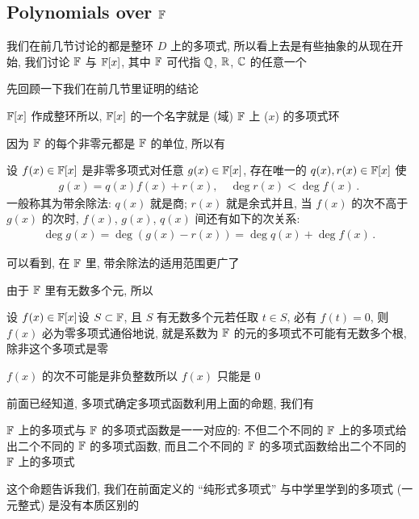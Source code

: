 \subsection*{Polynomials over $\mathbb{F}$}

我们在前几节讨论的都是整环 $D$ 上的多项式, 所以看上去是有些抽象的\period 从现在开始, 我们讨论 $\mathbb{F}$ 与 $\mathbb{F}[x]$, 其中 $\mathbb{F}$ 可代指 $\mathbb{Q}$, $\mathbb{R}$, $\mathbb{C}$ 的任意一个\period

先回顾一下我们在前几节里证明的结论\period

\begin{proposition}
    $\mathbb{F}[x]$ 作成整环\period 所以, $\mathbb{F}[x]$ 的一个名字就是 (域) $\mathbb{F}$ 上 ($x$) 的多项式环\period
\end{proposition}

因为 $\mathbb{F}$ 的每个非零元都是 $\mathbb{F}$ 的单位, 所以有

\begin{proposition}
    设 $f(x) \in \mathbb{F}[x]$ 是非零多项式\period 对任意 $g(x) \in \mathbb{F}[x]$, 存在唯一的 $q(x), r(x) \in \mathbb{F}[x]$ 使
    \begin{align*}
        g(x) = q(x) f(x) + r(x), \quad \deg r(x) < \deg f(x) \period
    \end{align*}
    一般称其为带余除法: $q(x)$ 就是商; $r(x)$ 就是余式\period 并且, 当 $f(x)$ 的次不高于 $g(x)$ 的次时, $f(x)$, $g(x)$, $q(x)$ 间还有如下的次关系:
    \begin{align*}
        \deg g(x) = \deg (g(x) - r(x)) = \deg q(x) + \deg f(x) \period
    \end{align*}
\end{proposition}

可以看到, 在 $\mathbb{F}$ 里, 带余除法的适用范围更广了\period

由于 $\mathbb{F}$ 里有无数多个元, 所以

\begin{proposition}
    设 $f(x) \in \mathbb{F}[x]$\period 设 $S \subset \mathbb{F}$, 且 $S$ 有无数多个元\period 若任取 $t \in S$, 必有 $f(t) = 0$, 则 $f(x)$ 必为零多项式\period 通俗地说, 就是系数为 $\mathbb{F}$ 的元的多项式不可能有无数多个根, 除非这个多项式是零\period
\end{proposition}

\begin{pf}
    $f(x)$ 的次不可能是非负整数\period 所以 $f(x)$ 只能是 $0$\period
\end{pf}

前面已经知道, 多项式确定多项式函数\period 利用上面的命题, 我们有

\begin{proposition}
    $\mathbb{F}$ 上的多项式与 $\mathbb{F}$ 的多项式函数是一一对应的: 不但二个不同的 $\mathbb{F}$ 上的多项式给出二个不同的 $\mathbb{F}$ 的多项式函数, 而且二个不同的 $\mathbb{F}$ 的多项式函数给出二个不同的 $\mathbb{F}$ 上的多项式\period
\end{proposition}

\begin{remark}
    这个命题告诉我们, 我们在前面定义的 ``纯形式多项式'' 与中学里学到的多项式 (一元整式) 是没有本质区别的\period
\end{remark}
